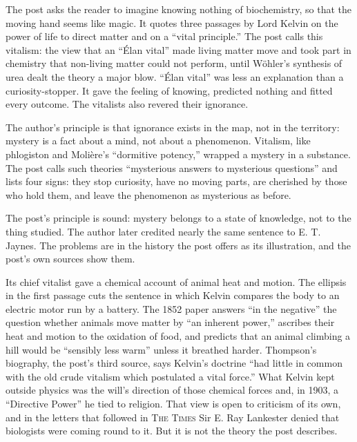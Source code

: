\begin{afterword}
\summaryhead

The post asks the reader to imagine knowing nothing of biochemistry, so that the moving hand seems like magic. It quotes three passages by Lord Kelvin on the power of life to direct matter and on a ``vital principle.'' The post calls this vitalism: the view that an ``Élan vital'' made living matter move and took part in chemistry that non-living matter could not perform, until Wöhler's synthesis of urea dealt the theory a major blow. ``Élan vital'' was less an explanation than a curiosity-stopper. It gave the feeling of knowing, predicted nothing and fitted every outcome. The vitalists also revered their ignorance.

The author's principle is that ignorance exists in the map, not in the territory: mystery is a fact about a mind, not about a phenomenon. Vitalism, like phlogiston and Molière's ``dormitive potency,'' wrapped a mystery in a substance. The post calls such theories ``mysterious answers to mysterious questions'' and lists four signs: they stop curiosity, have no moving parts, are cherished by those who hold them, and leave the phenomenon as mysterious as before.

\responsehead

The post's principle is sound: mystery belongs to a state of knowledge, not to the thing studied. The author later credited nearly the same sentence to E. T. Jaynes. The problems are in the history the post offers as its illustration, and the post's own sources show them.

Its chief vitalist gave a chemical account of animal heat and motion. The ellipsis in the first passage cuts the sentence in which Kelvin compares the body to an electric motor run by a battery. The 1852 paper answers ``in the negative'' the question whether animals move matter by ``an inherent power,'' ascribes their heat and motion to the oxidation of food, and predicts that an animal climbing a hill would be ``sensibly less warm'' unless it breathed harder. Thompson's biography, the post's third source, says Kelvin's doctrine ``had little in common with the old crude vitalism which postulated a vital force.'' What Kelvin kept outside physics was the will's direction of those chemical forces and, in 1903, a ``Directive Power'' he tied to religion. That view is open to criticism of its own, and in the letters that followed in \textsc{The Times} Sir E. Ray Lankester denied that biologists were coming round to it. But it is not the theory the post describes.


\end{afterword}
